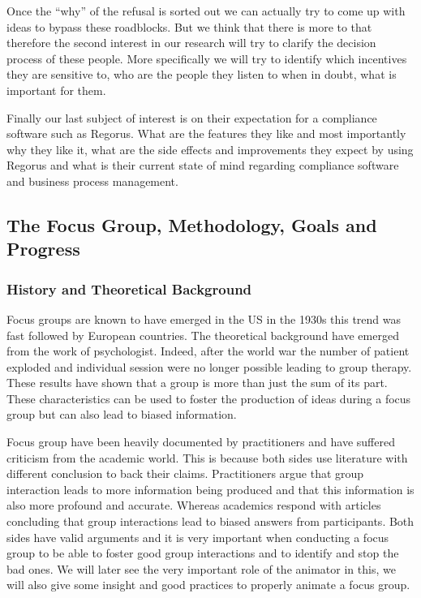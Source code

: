 \documentclass[10pt]{report}
\begin{document}
Once the \enquote{why} of the refusal is sorted out we can actually try to come up with ideas to bypass these roadblocks. But we think that there is more to that therefore the second interest in our research will try to clarify the decision process of these people. More specifically we will try to identify which incentives they are sensitive to, who are the people they listen to when in doubt, what is important for them.

Finally our last subject of interest is on their expectation for a compliance software such as Regorus. What are the features they like and most importantly why they like it, what are the side effects and improvements they expect by using Regorus and what is their current state of mind regarding compliance software and business process management.



\subsection{The Focus Group, Methodology, Goals and Progress}

\subsubsection{History and Theoretical Background}
Focus groups are known to have emerged in the US in the 1930s this trend was fast followed by European countries. The theoretical background have emerged from the work of psychologist. Indeed, after the world war the number of patient exploded and individual session were no longer possible leading to group therapy. These results have shown that a group is more than just the sum of its part. These characteristics can be used to foster the production of ideas during a focus group but can also lead to biased information.

Focus group have been heavily documented by practitioners and have suffered criticism from the academic world. This is because both sides use literature with different conclusion to back their claims. Practitioners argue that group interaction leads to more information being produced and that this information is also more profound and accurate. Whereas academics respond with articles concluding that group interactions lead to biased answers from participants. Both sides have valid arguments and it is very important when conducting a focus group to be able to foster good group interactions and to identify and stop the bad ones. We will later see the very important role of the animator in this, we will also give some insight and good practices to properly animate a focus group.
\end{document}
